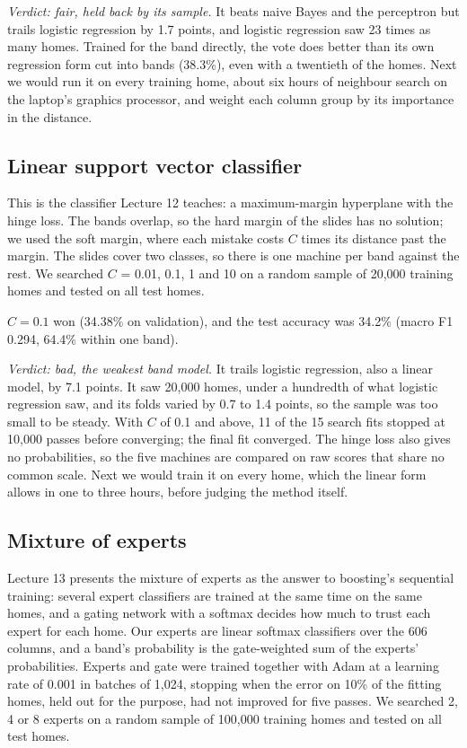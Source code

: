 \documentclass[sigconf,nonacm,10pt]{acmart}
\begin{document}
\emph{Verdict: fair, held back by its sample.} It beats naive Bayes and the perceptron but trails logistic regression by 1.7 points, and logistic regression saw 23 times as many homes. Trained for the band directly, the vote does better than its own regression form cut into bands (38.3\%), even with a twentieth of the homes. Next we would run it on every training home, about six hours of neighbour search on the laptop's graphics processor, and weight each column group by its importance in the distance.

\subsection{Linear support vector classifier}
This is the classifier Lecture 12 teaches: a maximum-margin hyperplane with the hinge loss. The bands overlap, so the hard margin of the slides has no solution; we used the soft margin, where each mistake costs $C$ times its distance past the margin. The slides cover two classes, so there is one machine per band against the rest. We searched $C$ = 0.01, 0.1, 1 and 10 on a random sample of 20,000 training homes and tested on all test homes.

$C = 0.1$ won (34.38\% on validation), and the test accuracy was 34.2\% (macro F1 0.294, 64.4\% within one band).

\emph{Verdict: bad, the weakest band model.} It trails logistic regression, also a linear model, by 7.1 points. It saw 20,000 homes, under a hundredth of what logistic regression saw, and its folds varied by 0.7 to 1.4 points, so the sample was too small to be steady. With $C$ of 0.1 and above, 11 of the 15 search fits stopped at 10,000 passes before converging; the final fit converged. The hinge loss also gives no probabilities, so the five machines are compared on raw scores that share no common scale. Next we would train it on every home, which the linear form allows in one to three hours, before judging the method itself.

\subsection{Mixture of experts}
Lecture 13 presents the mixture of experts as the answer to boosting's sequential training: several expert classifiers are trained at the same time on the same homes, and a gating network with a softmax decides how much to trust each expert for each home. Our experts are linear softmax classifiers over the 606 columns, and a band's probability is the gate-weighted sum of the experts' probabilities. Experts and gate were trained together with Adam at a learning rate of 0.001 in batches of 1,024, stopping when the error on 10\% of the fitting homes, held out for the purpose, had not improved for five passes. We searched 2, 4 or 8 experts on a random sample of 100,000 training homes and tested on all test homes.
\end{document}
